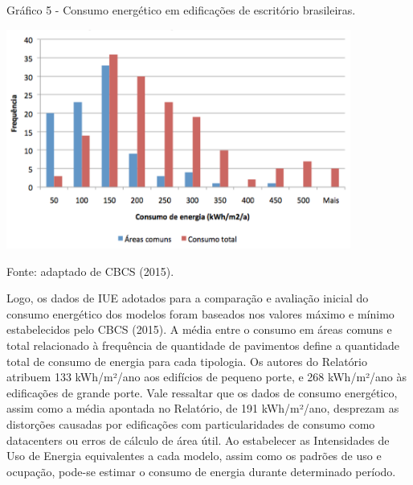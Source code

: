     \begin{graph}
        \par \small Gráfico 5 - Consumo energético em edificações de escritório brasileiras.
        \begin{minipage}[ht]{1\textwidth}\centering
            \includegraphics[width=0.85\textwidth]{figures/fig9_consumo-total-das-edificacoes-levantadas_cbcs_2015.png}            
        \end{minipage}
        \begin{flushleft}
            \par \small Fonte: adaptado de CBCS (2015).
        \end{flushleft}
    \end{graph}

\noindent Logo, os dados de IUE adotados para a comparação e avaliação inicial do consumo energético dos 
modelos foram baseados nos valores máximo e mínimo estabelecidos pelo CBCS (2015). A média 
entre o consumo em áreas comuns e total relacionado à frequência de quantidade de pavimentos 
define a quantidade total de consumo de energia para cada tipologia.\vspace*{0.3cm} \newline
Os autores do Relatório atribuem 133 kWh/m²/ano aos edifícios de pequeno porte, e 
268 kWh/m²/ano às edificações de grande porte. Vale ressaltar que os dados de consumo 
energético, assim como a média apontada no Relatório, de 191 kWh/m²/ano, desprezam as 
distorções causadas por edificações com particularidades de consumo como datacenters ou erros 
de cálculo de área útil.\vspace*{0.3cm} \newline
Ao estabelecer as Intensidades de Uso de Energia equivalentes a cada modelo, assim como os 
padrões de uso e ocupação, pode-se estimar o consumo de energia durante determinado período.

